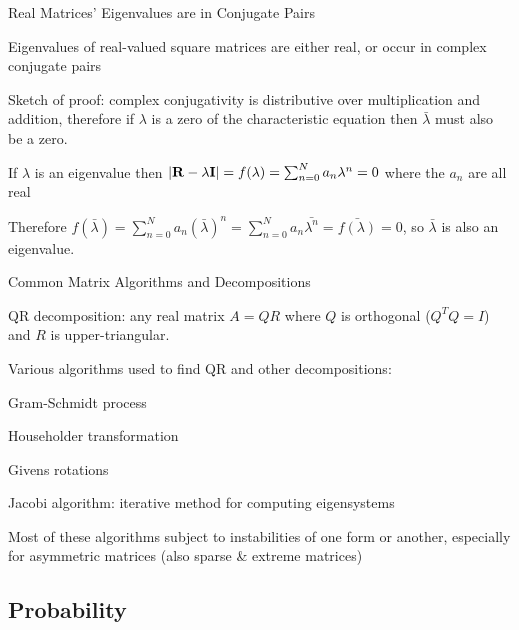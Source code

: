 \documentclass{beamer}
\begin{document}
\begin{frame}{Real Matrices' Eigenvalues are in Conjugate Pairs}

\itemb
 \item Eigenvalues of real-valued square matrices are either real, or occur in complex conjugate pairs
  \itemb
  \item Sketch of proof: complex conjugativity is distributive over multiplication and addition,
         therefore if $\lambda$ is a zero of the characteristic equation then $\bar{\lambda}$ must also be a zero.
  \item If $\lambda$ is an eigenvalue then $|{\bf R}-\lambda{\bf I}| = f(\lambda) = \sum_{n=0}^N a_n \lambda^n = 0$ where the $a_n$ are all real
  \item Therefore $f(\bar{\lambda}) = \sum_{n=0}^N a_n (\bar{\lambda})^n = \sum_{n=0}^N a_n \bar{\lambda^n} = \bar{f(\lambda)} = 0$, so $\bar{\lambda}$ is also an eigenvalue.
  \iteme
 \iteme

\end{frame}

\begin{frame}{Common Matrix Algorithms and Decompositions}

\itemb
\item QR decomposition: any real matrix $A = QR$ where $Q$ is orthogonal ($Q^T Q = I$) and $R$ is upper-triangular.
\item Various algorithms used to find QR and other decompositions:
 \itemb
 \item Gram-Schmidt process
 \item Householder transformation
 \item Givens rotations
 \iteme
\item Jacobi algorithm: iterative method for computing eigensystems
\item Most of these algorithms subject to \alert{instabilities} of one form or another, especially for \alert{asymmetric} matrices (also sparse \& extreme matrices)
\iteme

\end{frame}

% 

\subsection{Probability}
\end{document}
